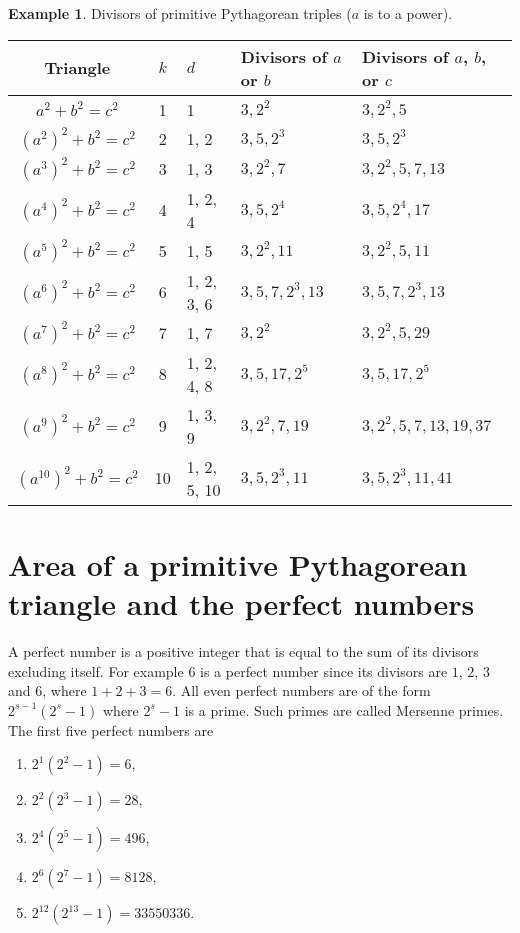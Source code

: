 \documentclass{article}
\renewcommand{\labelenumi}{\roman{enumi}.}
\theoremstyle{definition}
\newtheorem{example}{Example}[section]
\begin{document}
\begin{example} Divisors of primitive Pythagorean triples (\(a\) is to a power).

\bigskip

\begin{minipage}{0.9\textwidth}
\centering
\begin{tabular}{c|cl|ll}
Triangle & \(k\) & \(d\) & Divisors of \(a\) or \(b\) & Divisors of \(a\), \(b\), or \(c\) \\[2pt] \hline
\(a^2+b^2=c^2\) & 1 & 1 & \(3, 2^2\) & \(3, 2^2, 5\) \\
\((a^2)^2+b^2=c^2\) & 2 & 1, 2 & \(3, 5, 2^3\) & \(3, 5, 2^3\) \\
\((a^3)^2+b^2=c^2\) & 3 & 1, 3 & \(3, 2^2, 7\) & \(3, 2^2, 5, 7, 13\) \\
\((a^4)^2+b^2=c^2\) & 4 & 1, 2, 4 & \(3, 5, 2^4\) & \(3, 5, 2^4, 17\) \\
\((a^5)^2+b^2=c^2\) & 5 & 1, 5 & \(3, 2^2, 11\) & \(3, 2^2, 5, 11\) \\
\((a^6)^2+b^2=c^2\) & 6 & 1, 2, 3, 6 & \(3, 5, 7, 2^3, 13\) & \(3, 5, 7, 2^3, 13\) \\
\((a^7)^2+b^2=c^2\) & 7 & 1, 7 & \(3, 2^2\) & \(3, 2^2, 5, 29\) \\
\((a^8)^2+b^2=c^2\) & 8 & 1, 2, 4, 8 & \(3, 5, 17, 2^5\) & \(3, 5, 17, 2^5\) \\
\((a^9)^2+b^2=c^2\) & 9 & 1, 3, 9 & \(3, 2^2, 7, 19\) & \(3, 2^2, 5, 7, 13, 19, 37\) \\
\((a^{10})^2+b^2=c^2\) & 10 & 1, 2, 5, 10 & \(3, 5, 2^3, 11\) & \(3, 5, 2^3, 11, 41\)
\end{tabular}
\end{minipage}
\end{example}

\section{Area of a primitive Pythagorean triangle and the perfect numbers}

A perfect number is a positive integer that is equal to the sum of its divisors excluding itself. For example \(6\) is a perfect number since its divisors are \(1\), \(2\), \(3\) and \(6\), where \(1+2+3=6\). All even perfect numbers are of the form \(2^{s-1} (2^s-1)\) where \(2^s-1\) is a prime. Such primes are called Mersenne primes. The first five perfect numbers are

\renewcommand{\labelenumi}{\arabic{enumi}.}
\begin{enumerate}
\item \(2^1 (2^2 - 1) = 6\),
\item \(2^2 (2^3 - 1) = 28\),
\item \(2^4 (2^5 - 1) = 496\),
\item \(2^6 (2^7 - 1) = 8128\),
\item \(2^{12} (2^{13} - 1) = 33550336\).
\end{enumerate}
\end{document}
